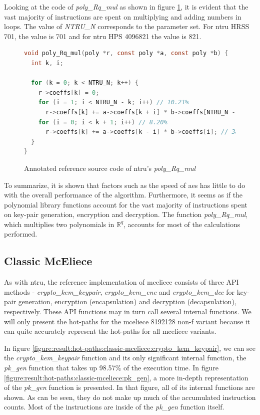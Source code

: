 \noindent Looking at the code of \textit{poly\_Rq\_mul} as shown in figure \ref{figure:result:hot-paths:ntru:poly_Rq_mul}, it is evident that the vast majority of instructions are spent on multiplying and adding numbers in loops. The value of \textit{NTRU\_N} corresponds to the parameter set. For \gls{ntru} HRSS 701, the value is 701 and for \gls{ntru} HPS 4096821 the value is 821.

\begin{figure}[H]
    \centering
    \begin{lstlisting}[language=C]
void poly_Rq_mul(poly *r, const poly *a, const poly *b) {
  int k, i;

  for (k = 0; k < NTRU_N; k++) {
    r->coeffs[k] = 0;
    for (i = 1; i < NTRU_N - k; i++) // 10.21%
      r->coeffs[k] += a->coeffs[k + i] * b->coeffs[NTRU_N - i]; // 42.75%
    for (i = 0; i < k + 1; i++) // 8.20%
      r->coeffs[k] += a->coeffs[k - i] * b->coeffs[i]; // 38.79%
  }
}
    \end{lstlisting}
    \caption{Annotated reference source code of \gls{ntru}'s \textit{poly\_Rq\_mul}}
    \label{figure:result:hot-paths:ntru:poly_Rq_mul}
\end{figure}

\clearpage To summarize, it is shown that factors such as the speed of \gls{aes} has little to do with the overall performance of the algorithm. Furthermore, it seems as if the polynomial library functions account for the vast majority of instructions spent on key-pair generation, encryption and decryption. The function \textit{poly\_Rq\_mul}, which multiplies two polynomials in $\mathbb{R}^q$, accounts for most of the calculations performed.

\subsection{Classic McEliece}
As with \gls{ntru}, the reference implementation of \gls{mceliece} consists of three API methods - \textit{crypto\_kem\_keypair}, \textit{crypto\_kem\_enc} and \textit{crypto\_kem\_dec} for key-pair generation, encryption (encapsulation) and decryption (decapsulation), respectively. These API functions may in turn call several internal functions. We will only present the hot-paths for the \gls{mceliece} 8192128 non-f variant because it can quite accurately represent the hot-paths for all \gls{mceliece} variants.

In figure \ref{figure:result:hot-paths:classic-mceliece:crypto_kem_keypair}, we can see the \textit{crypto\_kem\_keypair} function and its only significant internal function, the \textit{pk\_gen} function that takes up 98.57\% of the execution time. In figure \ref{figure:result:hot-paths:classic-mceliece:pk_gen}, a more in-depth representation of the \textit{pk\_gen} function is presented. In that figure, all of its internal functions are shown. As can be seen, they do not make up much of the accumulated instruction counts. Most of the instructions are inside of the \textit{pk\_gen} function itself.

